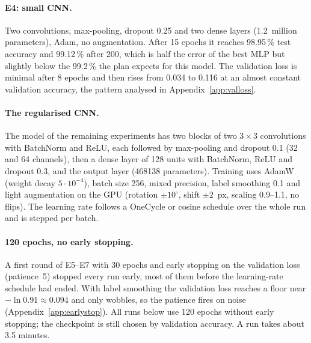 \documentclass[11pt,a4paper]{article}
\newcommand{\1}{\mathbf{1}}
\begin{document}
\paragraph{E4: small CNN.} Two convolutions, max-pooling, dropout 0.25 and two dense layers
(1.2~million parameters), Adam, no augmentation. After 15 epochs it reaches 98.95\,\% test
accuracy and 99.12\,\% after 200, which is half the error of the best MLP but slightly below the
99.2\,\% the plan expects for this model. The validation loss is minimal after 8 epochs and
then rises from 0.034 to 0.116 at an almost constant validation accuracy, the pattern analysed in
Appendix~\ref{app:valloss}.

\paragraph{The regularised CNN.} The model of the remaining experiments has two blocks of two
$3 \times 3$ convolutions with BatchNorm and ReLU, each followed by max-pooling and dropout 0.1
(32 and 64 channels), then a dense layer of 128 units with BatchNorm, ReLU and dropout 0.3, and the
output layer (\num{468138} parameters). Training uses AdamW (weight decay $5 \cdot 10^{-4}$),
batch size 256, mixed precision, label smoothing 0.1 and light augmentation on the GPU (rotation
$\pm 10^\circ$, shift $\pm 2$~px, scaling 0.9--1.1, no flips). The learning rate follows a
OneCycle or cosine schedule over the whole run and is stepped per batch.

\paragraph{120 epochs, no early stopping.} A first round of E5--E7 with 30 epochs and early
stopping on the validation loss (patience~5) stopped every run early, most of them before the
learning-rate schedule had ended. With label smoothing the validation loss reaches a floor near
$-\ln 0.91 \approx 0.094$ and only wobbles, so the patience fires on noise
(Appendix~\ref{app:earlystop}). All runs below use 120 epochs without early stopping; the
checkpoint is still chosen by validation accuracy. A run takes about 3.5 minutes.
\end{document}
